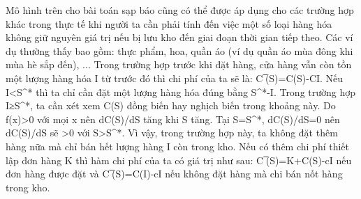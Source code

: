 \begin{multicols}{2}
	Mô hình trên cho bài toán sạp báo cũng có thể được áp dụng cho các trường hợp khác trong thực tế khi người ta cần phải tính đến việc một số loại hàng hóa không giữ nguyên giá trị nếu bị lưu kho đến giai đoạn thời gian tiếp theo. Các ví dụ thường thấy bao gồm: thực phẩm, hoa, quần áo (ví dụ quần áo mùa đông khi mùa hè sắp đến), ...
	Trong trường hợp trước khi đặt hàng, cửa hàng vẫn còn tồn một lượng hàng hóa I từ trước đó thì chi phí của ta sẽ là:
	C ̅(S)=C(S)-CI.
	Nếu I<S^* thì ta chỉ cần đặt một lượng hàng hóa đúng bằng S^*-I.
	Trong trường hợp I≥S^*, ta cần xét xem C(S) đồng biến hay nghịch biến trong khoảng này. Do f(x)>0 với mọi x nên dC(S)/dS tăng khi S tăng. Tại S=S^*, dC(S)/dS=0 nên dC(S)/dS sẽ >0 với S>S^*. Vì vậy, trong trường hợp này, ta không đặt thêm hàng nữa mà chỉ bán hết lượng hàng I còn trong kho.
	Nếu có thêm chi phí thiết lập đơn hàng K thì hàm chi phí của ta có giá trị như sau:
	C ̅(S)=K+C(S)-cI nếu đơn hàng được đặt
	và  C ̅(S)=C(I)-cI nếu không đặt hàng mà chi bán nốt hàng trong kho.
	

\end{multicols}
